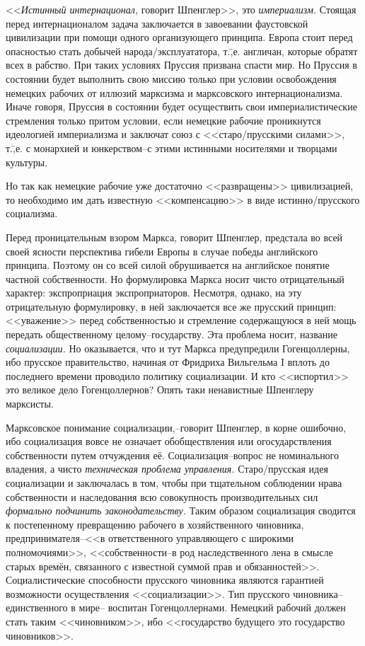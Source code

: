 <<\emph{Истинный интернационал,} говорит Шпенглер>>, это \emph{империализм.} Стоящая перед интернационалом задача заключается в завоевании фаустовской цивилизации при помощи одного организующего принципа. Европа стоит перед опасностью стать добычей народа\-/эксплуататора, т.\=,е. англичан, которые обратят всех в рабство. При таких условиях Пруссия призвана спасти мир. Но Пруссия в состоянии будет выполнить свою миссию только при условии освобождения немецких рабочих от иллюзий марксизма и марксовского интернационализма. Иначе говоря, Пруссия в состоянии будет осуществить свои империалистические стремления только притом условии, если немецкие рабочие проникнутся идеологией империализма и заключат союз с <<старо\-/прусскими силами>>, т.\=,е. с монархией и юнкерством\---с этими истинными носителями и творцами культуры.

Но так как немецкие рабочие уже достаточно <<развращены>> цивилизацией, то необходимо им дать известную <<компенсацию>> в виде истинно\-/прусского социализма.

Перед проницательным взором Маркса, говорит Шпенглер, предстала во всей своей ясности перспектива гибели Европы в случае победы английского принципа. Поэтому он со всей силой обрушивается на английское понятие частной собственности. Но формулировка Маркса носит чисто отрицательный характер: экспроприация экспроприаторов. Несмотря, однако, на эту отрицательную формулировку, в ней заключается все же прусский принцип: <<уважение>> перед собственностью и стремление содержащуюся в ней мощь передать общественному целому\---государству. Эта проблема носит, название \emph{социализации.} Но оказывается, что и тут Маркса предупредили Гогенцоллерны, ибо прусское правительство, начиная от Фридриха Вильгельма I вплоть до последнего времени проводило политику социализации. И кто <<испортил>> это великое дело Гогенцоллернов? Опять таки ненавистные Шпенглеру марксисты.

Марксовское понимание социализации,\---говорит Шпенглер, в корне ошибочно, ибо социализация вовсе не означает обобществления или огосударствления собственности путем отчуждения её. Социализация\---вопрос не номинального владения, а чисто \emph{техническая проблема управления.} Старо\-/прусская идея социализации и заключалась в том, чтобы при тщательном соблюдении нрава собственности и наследования всю совокупность производительных сил \emph{формально подчинить законодательству.} Таким образом социализация сводится к постепенному превращению рабочего в хозяйственного чиновника, предпринимателя\---<<в ответственного управляющего с широкими полномочиями>>, <<собственности\---в род наследственного лена в смысле старых времён, связанного с известной суммой прав и обязанностей>>. Социалистические способности прусского чиновника являются гарантией возможности осуществления <<социализации>>. Тип прусского чиновника\---единственного в мире\--- воспитан Гогенцоллернами. Немецкий рабочий должен стать таким <<чиновником>>, ибо <<государство будущего это государство чиновников>>.

